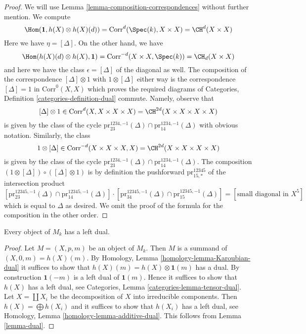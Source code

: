 \begin{proof}
We will use Lemma \ref{lemma-composition-correspondences}
without further mention. We compute
$$
\Hom(\mathbf{1}, h(X) \otimes h(X)(d)) =
\text{Corr}^d(\Spec(k), X \times X) = \CH^d(X \times X)
$$
Here we have $\eta = [\Delta]$. On the other hand, we have
$$
\Hom(h(X)(d) \otimes h(X), \mathbf{1}) =
\text{Corr}^{-d}(X \times X, \Spec(k)) = \CH_d(X \times X)
$$
and here we have the class $\epsilon = [\Delta]$
of the diagonal as well. The composition of the correspondence
$[\Delta] \otimes 1$ with $1 \otimes [\Delta]$ either way
is the correspondence $[\Delta] = 1$ in $\text{Corr}^0(X, X)$ which proves
the required diagrams of
Categories, Definition \ref{categories-definition-dual} commute.
Namely, observe that
$$
[\Delta] \otimes 1 \in \text{Corr}^d(X, X \times X \times X) =
\CH^{2d}(X \times X \times X \times X)
$$
is given by the class of the cycle
$\text{pr}^{1234, -1}_{23}(\Delta) \cap \text{pr}^{1234, -1}_{14}(\Delta)$ with
obvious notation. Similarly, the class
$$
1 \otimes [\Delta] \in \text{Corr}^{-d}(X \times X \times X, X) =
\CH^{2d}(X \times X \times X \times X)
$$
is given by the class of the cycle
$\text{pr}^{1234, -1}_{23}(\Delta) \cap \text{pr}^{1234, -1}_{14}(\Delta)$.
The composition $(1 \otimes [\Delta]) \circ ([\Delta] \otimes 1)$
is by definition the pushforward $\text{pr}^{12345}_{15, *}$
of the intersection product
$$
[\text{pr}^{12345, -1}_{23}(\Delta) \cap \text{pr}^{12345, -1}_{14}(\Delta)]
\cdot
[\text{pr}^{12345, -1}_{34}(\Delta) \cap \text{pr}^{12345, -1}_{15}(\Delta)]
=
[\text{small diagonal in } X^5]
$$
which is equal to $\Delta$ as desired. We omit the proof of the formula
for the composition in the other order.
\end{proof}

\begin{lemma}
\label{lemma-dual-general}
Every object of $M_k$ has a left dual.
\end{lemma}

\begin{proof}
Let $M = (X, p, m)$ be an object of $M_k$. Then $M$ is a summand of
$(X, 0, m) = h(X)(m)$.
By Homology, Lemma \ref{homology-lemma-Karoubian-dual}
it suffices to show that
$h(X)(m) = h(X) \otimes \mathbf{1}(m)$ has a dual.
By construction $\mathbf{1}(-m)$ is a left dual of $\mathbf{1}(m)$.
Hence it suffices to show that $h(X)$ has a left dual, see
Categories, Lemma \ref{categories-lemma-tensor-dual}.
Let $X = \coprod X_i$ be the decomposition of $X$ into
irreducible components. Then $h(X) = \bigoplus h(X_i)$
and it suffices to show that $h(X_i)$ has a left dual, see
Homology, Lemma \ref{homology-lemma-additive-dual}.
This follows from Lemma \ref{lemma-dual}.
\end{proof}







